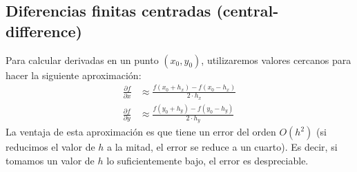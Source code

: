 \documentclass[
  11pt,
  letterpaper,
   answers
  ]{exam}
\begin{document}
\subsection*{Diferencias finitas centradas (central-difference)}
Para calcular derivadas en un punto $(x_0, y_0)$, utilizaremos valores cercanos para hacer la siguiente aproximación:
\begin{align}
    \frac{\partial f}{\partial x} & \approx \frac{f(x_0 + h_x) - f(x_0 - h_x)}{2 \cdot h_x} \\
    \frac{\partial f}{\partial y} & \approx \frac{f(y_0 + h_y) - f(y_0 - h_y)}{2 \cdot h_y}
\end{align}
La ventaja de esta aproximación es que tiene un error del orden $O(h^2)$ (si reducimos el valor de $h$ a la mitad, el error se reduce a un cuarto). Es decir, si tomamos un valor de $h$ lo suficientemente bajo, el error es despreciable. 
\newpage
\end{document}

